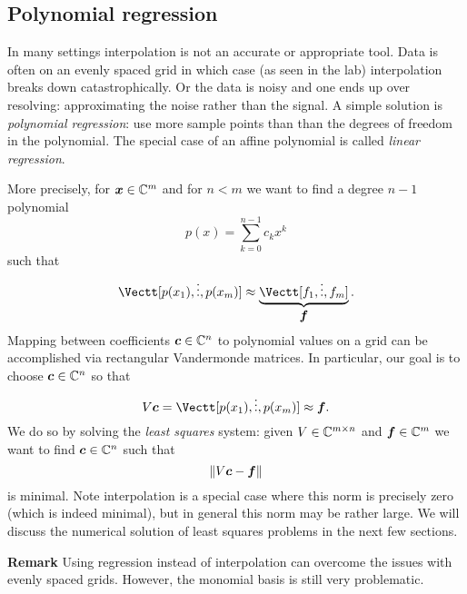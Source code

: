 \subsection{Polynomial regression}
In many settings interpolation is not an accurate or appropriate tool. Data is often on an evenly spaced grid in which case (as seen in the lab) interpolation breaks down catastrophically. Or the data is noisy and one ends up over resolving: approximating the noise rather than the signal. A simple solution is \emph{polynomial regression}: use more sample points than than the degrees of freedom in the polynomial. The special case of an affine polynomial is called \emph{linear regression}.

More precisely, for $\bm{{\mbox{\boldmath$x$\unboldmath}}} \in {\mathbb C}^m$ and for $n < m$ we want to find a degree $n-1$ polynomial
\[
p(x) = \ensuremath{\sum}_{k=0}^{n-1} c_k x^k
\]
such that
\[
\Vectt[p(x_1), \ensuremath{\vdots}, p(x_m)] \ensuremath{\approx} \underbrace{\Vectt[f_1,\ensuremath{\vdots},f_m]}_{\ensuremath{\bm{\f}}}.
\]
Mapping between coefficients $\bm{{\mbox{\boldmath$c$\unboldmath}}} \in {\mathbb C}^n$ to polynomial values on a grid can be accomplished  via rectangular Vandermonde matrices. In particular, our goal is to choose $\bm{{\mbox{\boldmath$c$\unboldmath}}} \in {\mathbb C}^n$ so that
\[
V \ensuremath{\bm{\c}}  = \Vectt[p(x_1), \ensuremath{\vdots}, p(x_m)] \ensuremath{\approx} \ensuremath{\bm{\f}}.
\]
We do so by solving the \emph{least squares} system: given $V \in {\mathbb C}^{m \times n}$ and $\bm{{\mbox{\boldmath$f$\unboldmath}}} \in {\mathbb C}^m$ we want to find $\bm{{\mbox{\boldmath$c$\unboldmath}}} \in {\mathbb C}^n$ such that
\[
\| V \bm{{\mbox{\boldmath$c$\unboldmath}}} - \bm{{\mbox{\boldmath$f$\unboldmath}}} \|
\]
is minimal. Note interpolation is a special case where this norm is precisely zero (which is indeed minimal), but in general this norm may be rather large.   We will discuss the numerical solution of least squares problems in the next few sections.

\textbf{Remark} Using regression instead of interpolation can overcome the issues with evenly spaced grids. However, the monomial basis is still very problematic.



